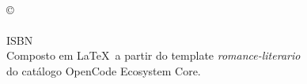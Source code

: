 \thispagestyle{empty}
\vspace*{\fill}
\begin{center}
\small
\titulolivro\\
\copyright\ \anoedicao\ \autornome\\
\editoralivro\\
ISBN \isbnlivro\\[6pt]
Composto em \LaTeX\ a partir do template \emph{romance-literario}\\
do catálogo OpenCode Ecosystem Core.
\end{center}
